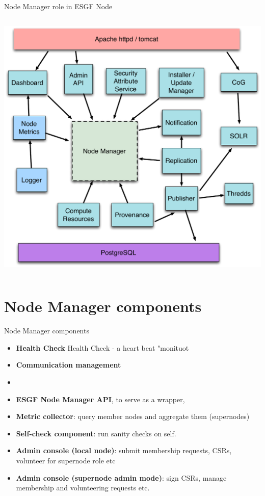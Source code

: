 \documentclass{beamer}
\begin{document}
\begin{frame}{Node Manager role in ESGF Node}
\begin{columns}
\begin{column}{.5\linewidth}
\includegraphics[width=\textwidth]{ESGF-node-components.pdf}
\end{column}
\end{columns}

\end{frame}

\section{Node Manager components}
\begin{frame}{Node Manager components}
\begin{itemize}
\item \textbf{Health Check}
Health Check - a heart beat "monituot
\item \textbf{Communication management}
\item


\item \textbf{ESGF Node Manager API}, to serve as a wrapper, 


\item \textbf{Metric collector}: query member nodes and aggregate them (supernodes)
\item \textbf{Self-check component}: run sanity checks on self.



\item \textbf{Admin console (local node)}: submit membership requests, CSRs, volunteer for supernode role etc
\item \textbf{Admin console (supernode admin mode)}: sign CSRs, manage membership and volunteering requests etc. 
\end{itemize}
\end{frame}
\end{document}
